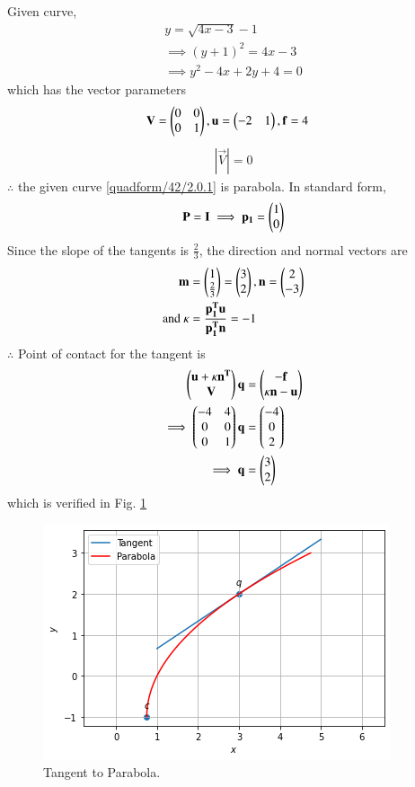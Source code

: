 Given curve,
\begin{align}
y = \sqrt{4x-3}-1\label{quadform/42/2.0.1}\\
\implies (y+1)^2 =4x-3\\
\implies y^2-4x+2y+4 =0
\end{align}
which has the vector parameters
\begin{align}
\mathbf{V}&=\begin{pmatrix}0 & 0 \\ 0 & 1\end{pmatrix},\mathbf{u}=\begin{pmatrix}-2 & 1 \end{pmatrix}, \mathbf{f} = 4 
\end{align}
\begin{align}
|\vec{V}| = 0
\end{align}
$\therefore $ the given curve \eqref{quadform/42/2.0.1} is parabola. In standard form,
\begin{align}
\mathbf{P} =\mathbf{I}\implies \mathbf{p_1} = \begin{pmatrix}1 \\ 0\end{pmatrix}
\end{align}
Since the slope of the tangents is $\frac{2}{3}$, the direction and normal vectors are
\begin{align}
\mathbf{m} &= \begin{pmatrix}1\\\frac{2}{3}\end{pmatrix}= \begin{pmatrix}3\\2\end{pmatrix},\mathbf{n} = \begin{pmatrix}2\\-3\end{pmatrix}\\
\text{and }
\kappa &= \frac{\mathbf{p_1^T}\mathbf{u}}{\mathbf{p_1^T}\mathbf{n}} = -1
\end{align}
$\therefore$ Point of contact for the tangent is
\begin{align}
  \begin{pmatrix}\mathbf{u}+\kappa \mathbf{n^T}\\\mathbf{V} \end{pmatrix}\mathbf{q} &= \begin{pmatrix}\mathbf{-f}\\\kappa \mathbf{n} -\mathbf{u}\end{pmatrix}\\
  \implies\begin{pmatrix}-4 & 4\\0 & 0 \\0 & 1\end{pmatrix} \mathbf{q}&= \begin{pmatrix}-4\\0\\2\end{pmatrix}\\
  \implies \mathbf{q}&=\begin{pmatrix}3\\2\end{pmatrix}
\end{align}
which is verified in Fig.     \ref{quadform/42/fig:Tangent to parabola.}
%
\begin{figure}[ht]
    \centering
    \includegraphics[width=\columnwidth]{solutions/su2021/2/42/PARABOLA.png}
    \caption{Tangent to Parabola.}
    \label{quadform/42/fig:Tangent to parabola.}
\end{figure}    


